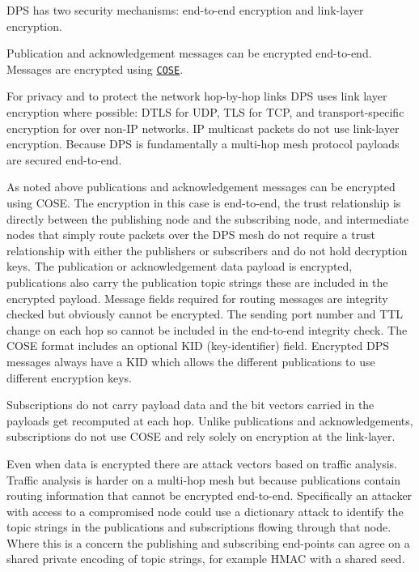 D\+PS has two security mechanisms\+: end-\/to-\/end encryption and link-\/layer encryption.

Publication and acknowledgement messages can be encrypted end-\/to-\/end. Messages are encrypted using \href{https://tools.ietf.org/html/rfc8152}{\tt C\+O\+SE}.

For privacy and to protect the network hop-\/by-\/hop links D\+PS uses link layer encryption where possible\+: D\+T\+LS for U\+DP, T\+LS for T\+CP, and transport-\/specific encryption for over non-\/\+IP networks. IP multicast packets do not use link-\/layer encryption. Because D\+PS is fundamentally a multi-\/hop mesh protocol payloads are secured end-\/to-\/end.

As noted above publications and acknowledgement messages can be encrypted using C\+O\+SE. The encryption in this case is end-\/to-\/end, the trust relationship is directly between the publishing node and the subscribing node, and intermediate nodes that simply route packets over the D\+PS mesh do not require a trust relationship with either the publishers or subscribers and do not hold decryption keys. The publication or acknowledgement data payload is encrypted, publications also carry the publication topic strings these are included in the encrypted payload. Message fields required for routing messages are integrity checked but obviously cannot be encrypted. The sending port number and T\+TL change on each hop so cannot be included in the end-\/to-\/end integrity check. The C\+O\+SE format includes an optional K\+ID (key-\/identifier) field. Encrypted D\+PS messages always have a K\+ID which allows the different publications to use different encryption keys.

Subscriptions do not carry payload data and the bit vectors carried in the payloads get recomputed at each hop. Unlike publications and acknowledgements, subscriptions do not use C\+O\+SE and rely solely on encryption at the link-\/layer.

Even when data is encrypted there are attack vectors based on traffic analysis. Traffic analysis is harder on a multi-\/hop mesh but because publications contain routing information that cannot be encrypted end-\/to-\/end. Specifically an attacker with access to a compromised node could use a dictionary attack to identify the topic strings in the publications and subscriptions flowing through that node. Where this is a concern the publishing and subscribing end-\/points can agree on a shared private encoding of topic strings, for example H\+M\+AC with a shared seed.

